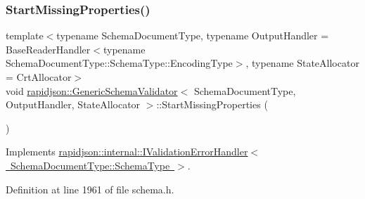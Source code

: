 \begin{DoxyCode}{0}

\end{DoxyCode}
\mbox{\label{classrapidjson_1_1_generic_schema_validator_ae2689c5db02a0f47bc986393c6a3f4ce}} 
\subsubsection{\texorpdfstring{StartMissingProperties()}{StartMissingProperties()}}
{\footnotesize\ttfamily template$<$typename Schema\+Document\+Type, typename Output\+Handler = Base\+Reader\+Handler$<$typename Schema\+Document\+Type\+::\+Schema\+Type\+::\+Encoding\+Type$>$, typename State\+Allocator = Crt\+Allocator$>$ \\
void \mbox{\hyperlink{classrapidjson_1_1_generic_schema_validator}{rapidjson\+::\+Generic\+Schema\+Validator}}$<$ Schema\+Document\+Type, Output\+Handler, State\+Allocator $>$\+::Start\+Missing\+Properties (\begin{DoxyParamCaption}{ }\end{DoxyParamCaption})\hspace{0.3cm}{\ttfamily [virtual]}}



Implements \mbox{\hyperlink{classrapidjson_1_1internal_1_1_i_validation_error_handler_a0fd6fed1e4200795bb7f0cc29e480596}{rapidjson\+::internal\+::\+I\+Validation\+Error\+Handler$<$ Schema\+Document\+Type\+::\+Schema\+Type $>$}}.



Definition at line 1961 of file schema.\+h.


